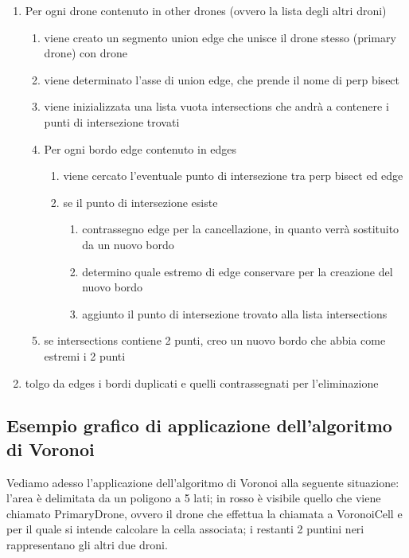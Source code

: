 \documentclass[11pt,a4paper]{report}
\newcommand{\name}[1]{{\ttfamily #1}}
\begin{document}
\begin{enumerate}
	\item Per ogni \name{drone} contenuto in \name{other drones} (ovvero la lista degli altri droni)
	\begin{enumerate}
		\item viene creato un segmento \name{union edge} che unisce il drone stesso (\name{primary drone}) con \name{drone}
		\item viene determinato l'asse di \name{union edge}, che prende il nome di \name{perp bisect}
		\item viene inizializzata una lista vuota \name{intersections} che andrà a contenere i punti di intersezione trovati
		\item Per ogni bordo \name{edge} contenuto in \name{edges}
		\begin{enumerate}
			\item viene cercato l'eventuale punto di intersezione tra \name{perp bisect} ed \name{edge}
			\item se il punto di intersezione esiste
			\begin{enumerate}
				\item contrassegno \name{edge} per la cancellazione, in quanto verrà sostituito da un nuovo bordo
				\item determino quale estremo di \name{edge} conservare per la creazione del nuovo bordo
				\item aggiunto il punto di intersezione trovato alla lista \name{intersections}
			\end{enumerate}
		\end{enumerate}
		\item se \name{intersections} contiene 2 punti, creo un nuovo bordo che abbia come estremi i 2 punti
	\end{enumerate}
	\item tolgo da \name{edges} i bordi duplicati e quelli contrassegnati per l'eliminazione
\end{enumerate}

\subsection{Esempio grafico di applicazione dell'algoritmo di Voronoi}

Vediamo adesso l'applicazione dell'algoritmo di Voronoi alla seguente situazione: l'area è delimitata da un poligono a 5 lati; in rosso è visibile quello che viene chiamato \name{PrimaryDrone}, ovvero il drone che effettua la chiamata a \name{VoronoiCell} e per il quale si intende calcolare la cella associata; i restanti 2 puntini neri rappresentano gli altri due droni.
\end{document}
